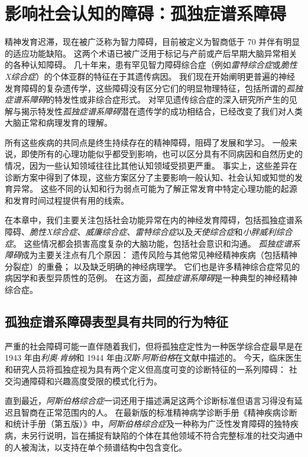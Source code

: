 \chapter{影响社会认知的障碍：孤独症谱系障碍} \label{chap:chap62}

精神发育迟滞，现在被广泛称为智力障碍，目前被定义为智商低于 70 并伴有明显的适应功能缺陷。
这两个术语已被广泛用于标记与产前或产后早期大脑异常相关的各种认知障碍。
几十年来，患有罕见智力障碍综合症（例如\textit{雷特综合症}或\textit{脆性X综合症}）的个体亚群的特征在于其遗传病因。
我们现在开始阐明更普遍的神经发育障碍的复杂遗传学，这些障碍没有区分它们的明显物理特征，包括所谓的\textit{孤独症谱系障碍}的特发性或非综合症形式。
对罕见遗传综合症的深入研究所产生的见解与揭示特发性\textit{孤独症谱系障碍}潜在遗传学的成功相结合，已经改变了我们对人类大脑正常和病理发育的理解。


所有这些疾病的共同点是终生持续存在的精神障碍，阻碍了发展和学习。
一般来说，即使所有的心理功能似乎都受到影响，也可以区分具有不同病因和自然历史的情况，因为一些认知领域往往比其他认知领域受损更严重。
事实上，这些差异在诊断方案中得到了体现，这些方案区分了主要影响一般认知、社会认知或知觉的发育异常。
这些不同的认知和行为弱点可能为了解正常发育中特定心理功能的起源和发育时间过程提供有用的线索。


在本章中，我们主要关注包括社会功能异常在内的神经发育障碍，包括孤独症谱系障碍、\textit{脆性X综合症}、\textit{威廉综合症}、\textit{雷特综合症}以及\textit{天使综合症}和\textit{小胖威利综合症}。
这些情况都会损害高度复杂的大脑功能，包括社会意识和沟通。
\textit{孤独症谱系障碍}成为主要关注点有几个原因：
遗传风险与其他常见神经精神疾病（包括精神分裂症）的重叠；
以及缺乏明确的神经病理学。
它们也是许多精神综合症常见的病因学和表型异质性的范例。
在这方面，\textit{孤独症谱系障碍}是一种典型的神经精神综合症。



\section{孤独症谱系障碍表型具有共同的行为特征}

严重的社会障碍可能一直伴随着我们，但将孤独症定性为一种医学综合症最早是在 1943 年由\textit{利奥$\cdot$肯纳}和 1944 年由\textit{汉斯$\cdot$阿斯伯格}在文献中描述的。
今天，临床医生和研究人员将孤独症视为具有两个定义但高度可变的诊断特征的一系列障碍：
社交沟通障碍和兴趣高度受限的模式化行为。


直到最近，\textit{阿斯伯格综合症}一词还用于描述满足这两个诊断标准但语言习得没有延迟且智商在正常范围内的人。
在最新版的标准精神病学诊断手册《精神疾病诊断和统计手册（第五版）》中，\textit{阿斯伯格综合症}及一种称为广泛性发育障碍的独特疾病，未另行说明，旨在捕捉有缺陷的个体在其他领域不符合完整标准的社交沟通中的人被淘汰，以支持在单个频谱结构中包含变化。


